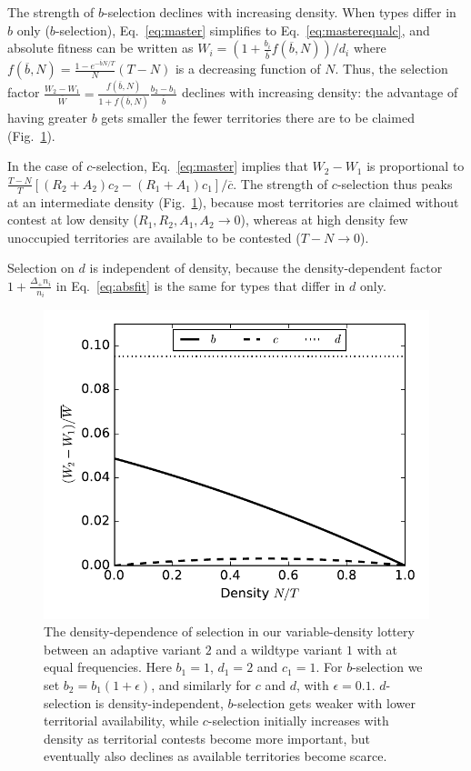 \documentclass[12pt]{article}
\begin{document}
The strength of $b$-selection declines with increasing density. When types differ in $b$ only ($b$-selection), Eq.~\eqref{eq:master} simplifies to Eq.~\eqref{eq:masterequalc}, and absolute fitness can be written as $W_i=(1+\frac{b_i}{\overline{b}}f(\overline{b},N))/d_i$ where $f(\overline{b},N)=\frac{1-e^{-\overline{b}N/T}}{N}(T-N)$ is a decreasing function of $N$. Thus, the selection factor $\frac{W_2-W_1}{\overline{W}}=\frac{f(\overline{b},N)}{1+f(\overline{b},N)}\frac{b_2-b_1}{\overline{b}}$ declines with increasing density: the advantage of having greater $b$ gets smaller the fewer territories there are to be claimed (Fig.~\ref{fig:DDS_lottery}). 

In the case of $c$-selection, Eq.~\eqref{eq:master} implies that $W_2-W_1$ is proportional to $\frac{T-N}{T} \left[(R_2+A_2)c_2-(R_1+A_1)c_1\right]/\overline{c}$. The strength of $c$-selection thus peaks at an intermediate density (Fig.~\ref{fig:DDS_lottery}), because most territories are claimed without contest at low density ($R_1,R_2,A_1,A_2\rightarrow 0$), whereas at high density few unoccupied territories are available to be contested ($T-N\rightarrow 0$). 

Selection on $d$ is independent of density, because the density-dependent factor $1 + \frac{\Delta_+ n_i}{n_i}$ in Eq.~\eqref{eq:absfit} is the same for types that differ in $d$ only.

\begin{figure}
\centering
\includegraphics[scale=0.8]{DDS_lottery.pdf}
\caption{\label{fig:DDS_lottery} The density-dependence of selection in our variable-density lottery between an adaptive variant $2$ and a wildtype variant $1$ with at equal frequencies. Here $b_1=1$, $d_1=2$ and $c_1=1$. For $b$-selection we set $b_2=b_1(1+\epsilon)$, and similarly for $c$ and $d$, with $\epsilon=0.1$. $d$-selection is density-independent, $b$-selection gets weaker with lower territorial availability, while $c$-selection initially increases with density as territorial contests become more important, but eventually also declines as available territories become scarce.}
\end{figure}
\end{document}
